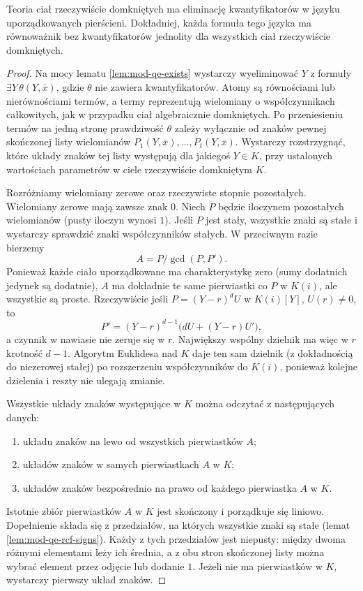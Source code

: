 \begin{twierdzenie}
\label{thm:mod-qe-rcf}
Teoria ciał rzeczywiście domkniętych ma eliminację
kwantyfikatorów w języku uporządkowanych pierścieni.
Dokładniej, każda formuła tego języka ma równoważnik
bez kwantyfikatorów jednolity dla wszystkich ciał
rzeczywiście domkniętych.
\end{twierdzenie}
\begin{proof}
Na mocy lematu \ref{lem:mod-qe-exists} wystarczy
wyeliminować $Y$ z formuły $\exists Y\,\theta(Y,\bar x)$,
gdzie $\theta$ nie zawiera kwantyfikatorów.
Atomy są równościami lub nierównościami termów,
a termy reprezentują wielomiany o współczynnikach
całkowitych, jak w przypadku ciał algebraicznie domkniętych.
Po przeniesieniu termów na jedną stronę prawdziwość
$\theta$ zależy wyłącznie od znaków pewnej skończonej
listy wielomianów $P_1(Y,\bar x),\ldots,P_t(Y,\bar x)$.
Wystarczy rozstrzygnąć, które układy znaków tej listy
występują dla jakiegoś $Y\in K$, przy ustalonych
wartościach parametrów w ciele rzeczywiście domkniętym $K$.

Rozróżniamy wielomiany zerowe oraz rzeczywiste stopnie
pozostałych. Wielomiany zerowe mają zawsze znak $0$.
Niech $P$ będzie iloczynem pozostałych wielomianów
(pusty iloczyn wynosi $1$). Jeśli $P$ jest stały,
wszystkie znaki są stałe i wystarczy sprawdzić znaki
współczynników stałych. W przeciwnym razie bierzemy
\[
A=P/\gcd(P,P').
\]
Ponieważ każde ciało uporządkowane ma charakterystykę
zero (sumy dodatnich jedynek są dodatnie), $A$ ma
dokładnie te same pierwiastki co $P$ w $K(i)$,
ale wszystkie są proste. Rzeczywiście jeśli
$P=(Y-r)^d U$ w $K(i)[Y]$, $U(r)\ne0$, to
\[
P'=(Y-r)^{d-1}\bigl(dU+(Y-r)U'\bigr),
\]
a czynnik w nawiasie nie zeruje się w $r$.
Największy wspólny dzielnik ma więc w $r$ krotność
$d-1$. Algorytm Euklidesa nad $K$ daje ten sam
dzielnik (z dokładnością do niezerowej stałej) po
rozszerzeniu współczynników do $K(i)$, ponieważ
kolejne dzielenia i reszty nie ulegają zmianie.

Wszystkie układy znaków występujące w $K$ można
odczytać z następujących danych:
\begin{enumerate}
\item układu znaków na lewo od wszystkich pierwiastków $A$;
\item układów znaków w samych pierwiastkach $A$ w $K$;
\item układów znaków bezpośrednio na prawo od każdego
pierwiastka $A$ w $K$.
\end{enumerate}
Istotnie zbiór pierwiastków $A$ w $K$ jest skończony
i porządkuje się liniowo. Dopełnienie składa się
z przedziałów, na których wszystkie znaki są stałe
(lemat \ref{lem:mod-qe-rcf-signs}).
Każdy z tych przedziałów jest niepusty: między
dwoma różnymi elementami leży ich średnia, a z obu
stron skończonej listy można wybrać element przez
odjęcie lub dodanie $1$. Jeżeli nie ma pierwiastków
w $K$, wystarczy pierwszy układ znaków.


\end{proof}
